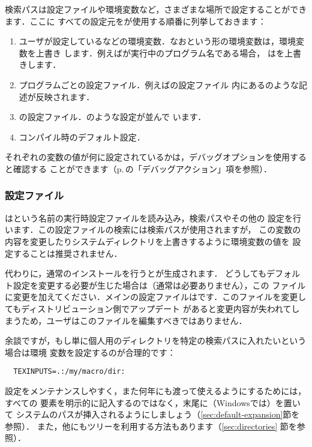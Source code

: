 \documentclass[uplatex,dvipdfmx,tombow]{jsarticle}
\begin{document}
検索パスは設定ファイルや環境変数など，さまざまな場所で設定することができます．ここに
すべての設定元を\KPS が使用する順番に列挙しておきます：
%
\begin{enumerate}
\item ユーザが設定しているなどの環境変数．なおという形の環境変数は，環境変数を上書き
  します．例えばが実行中のプログラム名である場合，%
  はを上書きします．
\item プログラムごとの設定ファイル．例えばの設定ファイル%
  内にあるのような記述が反映されます．
\item \KPS の設定ファイル．のような設定が並んで
  います．
\item コンパイル時のデフォルト設定．
\end{enumerate}
%
それぞれの変数の値が何に設定されているかは，デバッグオプションを使用すると確認する
ことができます（p.\,\pageref{sec:debugging}の「デバッグアクション」項を参照）．

\subsubsection{設定ファイル}

\KPS はという名前の実行時設定ファイルを読み込み，検索パスやその他の
設定を行います．この設定ファイルの検索には検索パスが使用されますが，
この変数の内容を変更したりシステムディレクトリを上書きするように環境変数の値を
設定することは推奨されません．

代わりに，通常のインストールを行うとが生成されます．
どうしてもデフォルト設定を変更する必要が生じた場合は（通常は必要ありません），この
ファイルに変更を加えてください．メインの設定ファイルはです．このファイルを変更してもディストリビューション側でアップデート
があると変更内容が失われてしまうため，ユーザはこのファイルを編集すべきではありません．

余談ですが，もし単に個人用のディレクトリを特定の検索パスに入れたいという場合は環境
変数を設定するのが合理的です：
%
\begin{verbatim}
  TEXINPUTS=.:/my/macro/dir:
\end{verbatim}
%
設定をメンテナンスしやすく，また何年にも渡って使えるようにするためには，すべての
要素を明示的に記入するのではなく，末尾に\samp{:}（Windowsでは\samp{;}）を置いて
システムのパスが挿入されるようにしましょう（\ref{sec:default-expansion}節を参照）．
また，他にもツリーを利用する方法もあります（\ref{sec:directories}%
節を参照）．
\end{document}
